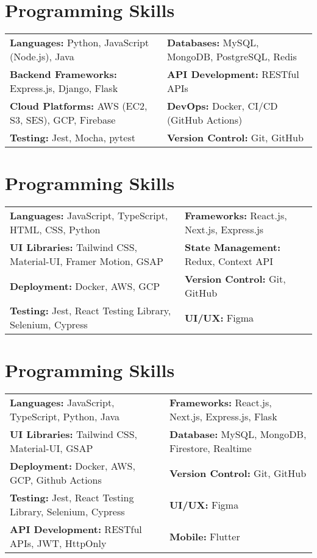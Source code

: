 \documentclass[letterpaper,10pt]{article}
\newcommand{\customFormat}[2]{\textbf{#1:} #2}
\begin{document}
{%
% 
\section{Programming Skills}
\begin{tabular}{ll}
    \customFormat{Languages}{Python, JavaScript (Node.js), Java} & \customFormat{Databases}{MySQL, MongoDB, PostgreSQL, Redis} \\ 
    \customFormat{Backend Frameworks}{Express.js, Django, Flask} & \customFormat{API Development}{RESTful APIs} \\
    \customFormat{Cloud Platforms}{AWS (EC2, S3, SES), GCP, Firebase} & \customFormat{DevOps}{Docker, CI/CD (GitHub Actions)} \\
    \customFormat{Testing}{Jest, Mocha, pytest} & \customFormat{Version Control}{Git, GitHub} \\
\end{tabular}

\section{Programming Skills}
 

\begin{tabular}{ll}
    \customFormat{Languages}{JavaScript, TypeScript, HTML, CSS, Python} & \customFormat{Frameworks}{React.js, Next.js, Express.js} \\
    \customFormat{UI Libraries}{Tailwind CSS, Material-UI, Framer Motion, GSAP} & \customFormat{State Management}{Redux, Context API} \\
    \customFormat{Deployment}{Docker, AWS, GCP} & \customFormat{Version Control}{Git, GitHub} \\
    \customFormat{Testing}{Jest, React Testing Library, Selenium, Cypress} & \customFormat{UI/UX}{Figma} \\
\end{tabular}
\section{Programming Skills}
\begin{tabular}{ll}
    \customFormat{Languages}{JavaScript, TypeScript, Python, Java} & \customFormat{Frameworks}{React.js, Next.js, Express.js, Flask} \\
    \customFormat{UI Libraries}{Tailwind CSS, Material-UI, GSAP} & \customFormat{Database}{MySQL, MongoDB, Firestore, Realtime} \\
    \customFormat{Deployment}{Docker, AWS, GCP, Github Actions} & \customFormat{Version Control}{Git, GitHub} \\
    \customFormat{Testing}{Jest, React Testing Library, Selenium, Cypress} & \customFormat{UI/UX}{Figma} \\
\customFormat{API Development}{RESTful APIs, JWT, HttpOnly} &
    \customFormat{Mobile}{Flutter}\\
\end{tabular}
}
\end{document}
